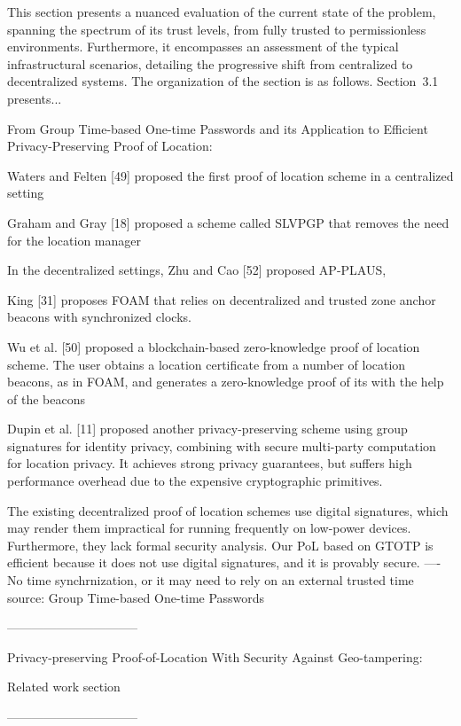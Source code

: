 This section presents a nuanced evaluation of the current state of the \pol{} problem, spanning the spectrum of its trust levels, from fully trusted to permissionless environments. Furthermore, it encompasses an assessment of the typical infrastructural scenarios, detailing the progressive shift from centralized to decentralized systems. The organization of the section is as follows. Section~3.1 presents...




From Group Time-based One-time Passwords and its Application to Efficient Privacy-Preserving Proof of Location:

Waters and Felten [49] proposed the first proof of location scheme in a centralized setting

Graham and Gray [18] proposed a scheme called SLVPGP that removes the need for the location manager

In the decentralized settings, Zhu and Cao [52] proposed AP-PLAUS,

King [31] proposes FOAM that relies on decentralized and
trusted zone anchor beacons with synchronized clocks.

Wu et al. [50] proposed a blockchain-based zero-knowledge proof of location scheme. The
user obtains a location certificate from a number of location beacons, as in FOAM, and generates a zero-knowledge proof of its with the help of the beacons

Dupin et al. [11] proposed another privacy-preserving scheme using group signatures for identity privacy, combining with secure multi-party computation for location privacy. It achieves strong privacy guarantees, but suffers high performance overhead due to the expensive cryptographic primitives.

The existing decentralized proof of location schemes use digital signatures, which may render them impractical for running frequently on low-power devices. Furthermore, they lack formal security analysis. Our PoL based on GTOTP is efficient because it does not use digital signatures, and it is provably secure. ---- No time synchrnization, or it may need to rely on an external trusted time source: Group Time-based One-time Passwords

--------------------------------

Privacy-preserving Proof-of-Location With Security Against Geo-tampering:

Related work section

--------------------------------

